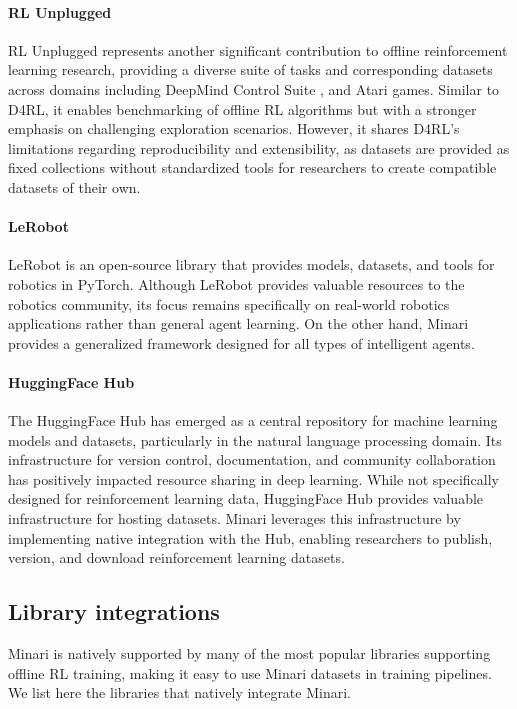 \documentclass{article}
\begin{document}
\paragraph{RL Unplugged} RL Unplugged \cite{rlunplugged} represents another significant contribution to offline reinforcement learning research, providing a diverse suite of tasks and corresponding datasets across domains including DeepMind Control Suite \cite{deepmindcontrolsuite}, and Atari games. Similar to D4RL, it enables benchmarking of offline RL algorithms but with a stronger emphasis on challenging exploration scenarios. However, it shares D4RL's limitations regarding reproducibility and extensibility, as datasets are provided as fixed collections without standardized tools for researchers to create compatible datasets of their own.

\paragraph{LeRobot} LeRobot \cite{lerobot} is an open-source library that provides models, datasets, and tools for robotics in PyTorch. Although LeRobot provides valuable resources to the robotics community, its focus remains specifically on real-world robotics applications rather than general agent learning. On the other hand, Minari provides a generalized framework designed for all types of intelligent agents.

\paragraph{HuggingFace Hub} The HuggingFace Hub has emerged as a central repository for machine learning models and datasets, particularly in the natural language processing domain. Its infrastructure for version control, documentation, and community collaboration has positively impacted resource sharing in deep learning. While not specifically designed for reinforcement learning data, HuggingFace Hub provides valuable infrastructure for hosting datasets. Minari leverages this infrastructure by implementing native integration with the Hub, enabling researchers to publish, version, and download reinforcement learning datasets.

\subsection{Library integrations}
\label{sec:integrations}
Minari is natively supported by many of the most popular libraries supporting offline RL training, making it easy to use Minari datasets in training pipelines. We list here the libraries that natively integrate Minari.
\end{document}
